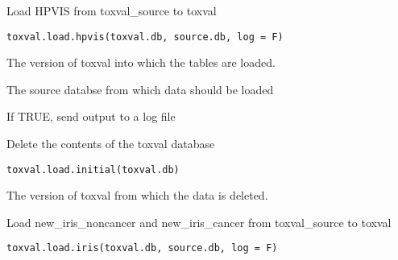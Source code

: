 \documentclass[letterpaper]{book}
\begin{document}
%
\begin{Description}\relax
Load HPVIS from toxval\_source to toxval
\end{Description}
%
\begin{Usage}
\begin{verbatim}
toxval.load.hpvis(toxval.db, source.db, log = F)
\end{verbatim}
\end{Usage}
%
\begin{Arguments}
\begin{ldescription}
\item[\code{toxval.db}] The version of toxval into which the tables are loaded.

\item[\code{source.db}] The source databse from which data should be loaded

\item[\code{log}] If TRUE, send output to a log file
\end{ldescription}
\end{Arguments}
%
\begin{Description}\relax
Delete the contents of the toxval database
\end{Description}
%
\begin{Usage}
\begin{verbatim}
toxval.load.initial(toxval.db)
\end{verbatim}
\end{Usage}
%
\begin{Arguments}
\begin{ldescription}
\item[\code{toxval.db}] The version of toxval from which the data is deleted.
\end{ldescription}
\end{Arguments}
%
\begin{Description}\relax
Load new\_iris\_noncancer and new\_iris\_cancer from toxval\_source to toxval
\end{Description}
%
\begin{Usage}
\begin{verbatim}
toxval.load.iris(toxval.db, source.db, log = F)
\end{verbatim}
\end{Usage}
\end{document}
